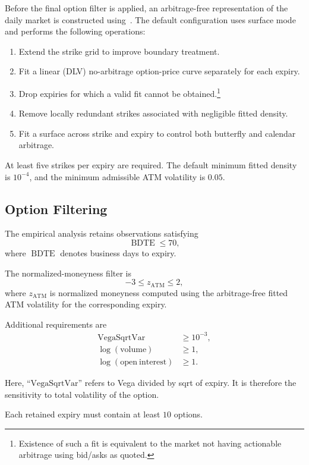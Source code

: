 \documentclass[11pt,a4paper]{article}
\begin{document}
Before the final option filter is applied, an arbitrage-free representation of the daily market is constructed using~\cite{SANOS2026}. The default configuration uses surface mode and performs the following operations:
%
\begin{enumerate}
    \item Extend the strike grid to improve boundary treatment.
    \item Fit a linear (DLV) no-arbitrage option-price curve separately for each expiry.
    \item Drop expiries for which a valid fit cannot be obtained.\footnote{
        Existence of such a fit is equivalent to the market not having actionable arbitrage
        using bid/asks as quoted.    
    }
    \item Remove locally redundant strikes associated with negligible fitted density.
    \item Fit a surface across strike and expiry to control both butterfly and calendar arbitrage.
\end{enumerate}

At least five strikes per expiry are required. The default minimum fitted density is \(10^{-4}\), and the minimum admissible ATM volatility is \(0.05\).

\subsection{Option Filtering}

The empirical analysis retains observations satisfying
%
\[
    \operatorname{BDTE} \leq 70,
\]
%
where \(\operatorname{BDTE}\) denotes business days to expiry.

The normalized-moneyness filter is
%
\[
    -3 \leq z_{\mathrm{ATM}} \leq 2,
\]
%
where \(z_{\mathrm{ATM}}\) is normalized moneyness computed using the
arbitrage-free fitted ATM volatility for the corresponding expiry.

Additional requirements are
%
\[
\begin{aligned}
    \mathrm{VegaSqrtVar} &\geq 10^{-3}, \\
    \log(\mathrm{volume}) &\geq 1, \\
    \log(\mathrm{open\ interest}) &\geq 1.
\end{aligned}
\]

Here, ``$\mathrm{VegaSqrtVar}$'' refers to Vega divided by sqrt of expiry. It is therefore
the sensitivity to total volatility of the option.

Each retained expiry must contain at least \(10\) options.
\end{document}
